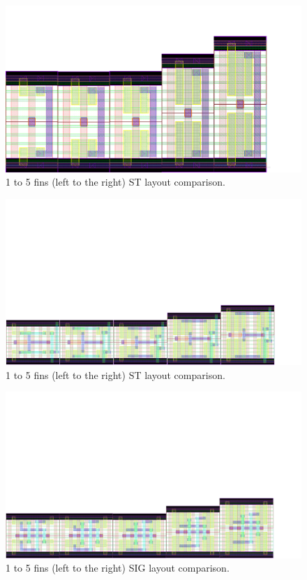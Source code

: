 \documentclass[pgmicro,mestrado,english]{iiufrgs}
\begin{document}
\begin{figure}[]
\centering
\includegraphics[width=\textwidth, trim={0cm 0cm 4cm 3cm},clip]{INVComp.pdf}
\caption{1 to 5 fins (left to the right) ST layout comparison.}
\label{fig:invComp}
\end{figure}

\begin{figure}[]
\centering
\includegraphics[width=\textwidth, trim={0cm 0cm 3cm 12cm},clip]{STComp.pdf}
\caption{1 to 5 fins (left to the right) ST layout comparison.}
\label{fig:stComp}
\end{figure}

\begin{figure}[]
\centering
\includegraphics[width=\textwidth, trim={0cm 0cm 3cm 12cm},clip]{SIGComp.pdf}
\caption{1 to 5 fins (left to the right) SIG layout comparison.}
\label{fig:sigComp}
\end{figure}
\end{document}
